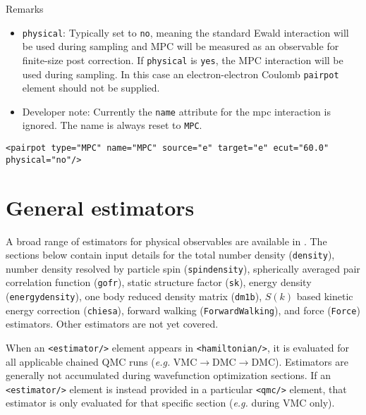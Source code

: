 \FloatBarrier
Remarks
\begin{itemize}
  \item{\texttt{physical}:  Typically set to \texttt{no}, meaning the standard Ewald interaction will be used during sampling and MPC will be measured as an observable for finite-size post correction.  If \texttt{physical} is \texttt{yes}, the MPC interaction will be used during sampling.  In this case an electron-electron Coulomb \texttt{pairpot} element should not be supplied.}
  \item{Developer note: Currently the \texttt{name} attribute for the mpc interaction is ignored.  The name is always reset to \texttt{MPC}.}
\end{itemize}

\begin{lstlisting}[caption=Modified periodic coulomb for finite size post-correction.]
  <pairpot type="MPC" name="MPC" source="e" target="e" ecut="60.0" physical="no"/>
\end{lstlisting}



\section{General estimators}

A broad range of estimators for physical observables are available in \qmcpack.  The sections below contain input details for the total number density (\texttt{density}), number density resolved by particle spin (\texttt{spindensity}), spherically averaged pair correlation function (\texttt{gofr}), static structure factor (\texttt{sk}), energy density (\texttt{energydensity}), one body reduced density matrix (\texttt{dm1b}), $S(k)$ based kinetic energy correction (\texttt{chiesa}), forward walking (\texttt{ForwardWalking}), and force (\texttt{Force}) estimators.  Other estimators are not yet covered.

When an \texttt{<estimator/>} element appears in \texttt{<hamiltonian/>}, it is evaluated for all applicable chained QMC runs (\emph{e.g.} VMC$\rightarrow$DMC$\rightarrow$DMC).  Estimators are generally not accumulated during wavefunction optimization sections.    If an \texttt{<estimator/>} element is instead provided in a particular \texttt{<qmc/>} element, that estimator is only evaluated for that specific section (\textit{e.g.} during VMC only).


